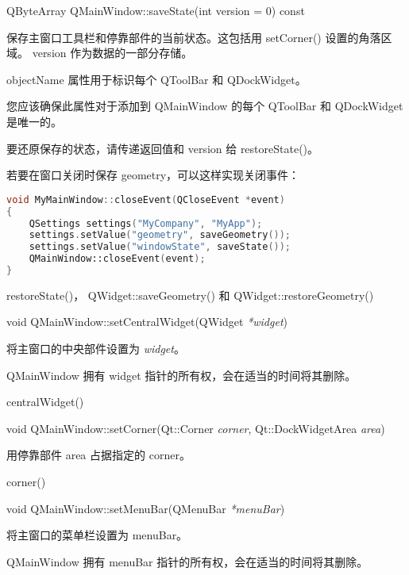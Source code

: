 \splitLine

QByteArray QMainWindow::saveState(int version = 0) const

保存主窗口工具栏和停靠部件的当前状态。这包括用 setCorner() 设置的角落区域。
version 作为数据的一部分存储。

objectName 属性用于标识每个 QToolBar 和 QDockWidget。

您应该确保此属性对于添加到 QMainWindow 的每个 QToolBar 和 QDockWidget 是唯一的。

要还原保存的状态，请传递返回值和 version 给 restoreState()。

若要在窗口关闭时保存 geometry，可以这样实现关闭事件：

\begin{lstlisting}[language=C++]
void MyMainWindow::closeEvent(QCloseEvent *event)
{
    QSettings settings("MyCompany", "MyApp");
    settings.setValue("geometry", saveGeometry());
    settings.setValue("windowState", saveState());
    QMainWindow::closeEvent(event);
}
\end{lstlisting}

\begin{seeAlso}
restoreState()， QWidget::saveGeometry() 和 QWidget::restoreGeometry()
\end{seeAlso}

\splitLine

void QMainWindow::setCentralWidget(QWidget \emph{*widget})

将主窗口的中央部件设置为 \emph{widget}。

\begin{notice}
QMainWindow 拥有 widget 指针的所有权，会在适当的时间将其删除。
\end{notice}

\begin{seeAlso}
centralWidget()
\end{seeAlso}

\splitLine

void QMainWindow::setCorner(Qt::Corner \emph{corner}, Qt::DockWidgetArea \emph{area})

用停靠部件 area 占据指定的 corner。

\begin{seeAlso}
corner()
 \end{seeAlso}

\splitLine

void QMainWindow::setMenuBar(QMenuBar \emph{*menuBar})

将主窗口的菜单栏设置为 menuBar。

\begin{notice}
QMainWindow 拥有 menuBar 指针的所有权，会在适当的时间将其删除。\end{notice}

